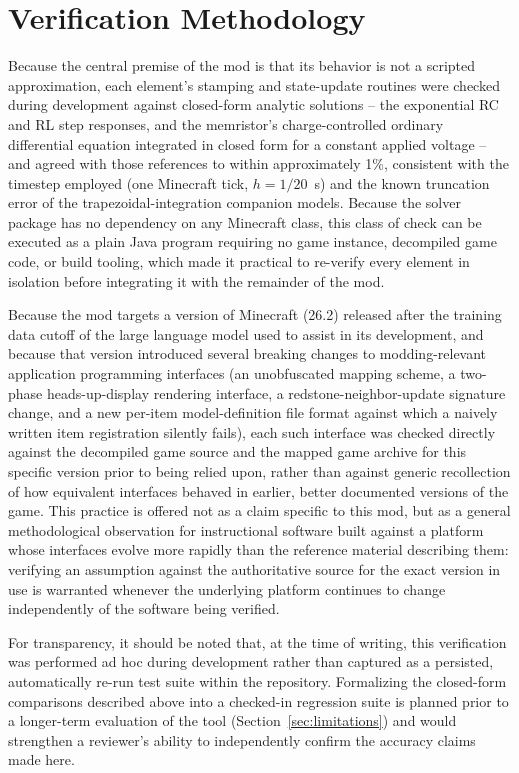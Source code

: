\section{Verification Methodology}
\label{sec:validation}

Because the central premise of the mod is that its behavior is not a scripted
approximation, each element's stamping and state-update routines were checked during
development against closed-form analytic solutions -- the exponential RC and RL step
responses, and the memristor's charge-controlled ordinary differential equation integrated
in closed form for a constant applied voltage -- and agreed with those references to within
approximately 1\%, consistent with the timestep employed (one Minecraft tick,
$h = 1/20$~s) and the known truncation error of the trapezoidal-integration companion
models. Because the solver package has no dependency on any Minecraft class, this class of
check can be executed as a plain Java program requiring no game instance, decompiled game
code, or build tooling, which made it practical to re-verify every element in isolation
before integrating it with the remainder of the mod.

Because the mod targets a version of Minecraft (26.2) released after the training data
cutoff of the large language model used to assist in its development, and because that
version introduced several breaking changes to modding-relevant application programming
interfaces (an unobfuscated mapping scheme, a two-phase heads-up-display rendering
interface, a redstone-neighbor-update signature change, and a new per-item
model-definition file format against which a naively written item registration silently
fails), each such interface was checked directly against the decompiled game source and the
mapped game archive for this specific version prior to being relied upon, rather than
against generic recollection of how equivalent interfaces behaved in earlier, better
documented versions of the game. This practice is offered not as a claim specific to this
mod, but as a general methodological observation for instructional software built against a
platform whose interfaces evolve more rapidly than the reference material describing them:
verifying an assumption against the authoritative source for the exact version in use is
warranted whenever the underlying platform continues to change independently of the
software being verified.

For transparency, it should be noted that, at the time of writing, this verification was
performed ad hoc during development rather than captured as a persisted, automatically
re-run test suite within the repository. Formalizing the closed-form comparisons described
above into a checked-in regression suite is planned prior to a longer-term evaluation of the
tool (Section~\ref{sec:limitations}) and would strengthen a reviewer's ability to
independently confirm the accuracy claims made here.
